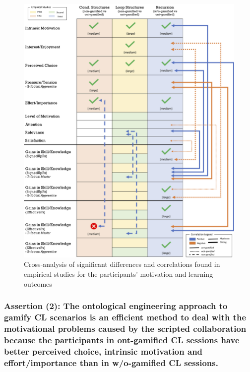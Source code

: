 \begin{figure}[htb]
 \caption{Cross-analysis of significant differences and correlations found in empirical studies for the participants' motivation and learning outcomes}
 \label{fig:cross-analysis}
 \centering
 \includegraphics[width=1\textwidth]{images/chap-evaluation/cross-analysis.png}
 \fautor
\end{figure}

\subsubsection*{Assertion (2): The ontological engineering approach to gamify CL scenarios is an efficient method to deal with the motivational problems caused by the scripted collaboration because the participants in ont-gamified CL sessions have better perceived choice, intrinsic motivation and effort/importance than in w/o-gamified CL sessions.}

